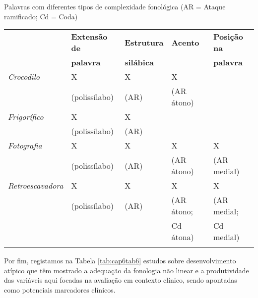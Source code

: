\documentclass[output=paper,colorlinks,citecolor=brown,booklanguage=portuguese]{langscibook}
\begin{document}
\begin{Tabela}
\caption{Palavras com diferentes tipos de complexidade fonológica (AR = Ataque ramificado; Cd = Coda)}
\label{tab:cap6tab5}


\begin{tabularx}{.95\textwidth}{lllll}
\lsptoprule
  & \textbf{Extensão de} & \textbf{Estrutura} & \textbf{Acento} & \textbf{Posição na}\\
  & \textbf{palavra} & \textbf{silábica} & &\textbf{palavra}\\
\midrule
  \emph{Crocodilo} & X & X & X & \uline{\phantom{xxxxxx}}\\
 & (polissílabo) & (AR) & (AR átono) &\\
 \tablevspace
 \emph{Frigorífico} & X & X & \uline{\phantom{xxxxxx}} & \uline{\phantom{xxxxxx}}\\
 & (polissílabo) &  (AR) &  &  \\
 \tablevspace
 \emph{Fotografia} & X & X & X & X\\
 & (polissílabo) &  (AR) & (AR átono) & (AR medial)\\
 \tablevspace
 \emph{Retroescavadora} & X & X & X & X\\
 & (polissílabo) &  (AR) & (AR átono;& (AR medial;\\
 &&& Cd átona) & Cd medial)\\
\lspbottomrule
 \end{tabularx}
 \end{Tabela}


 Por fim, registamos na Tabela \ref{tab:cap6tab6} estudos sobre desenvolvimento atípico que têm mostrado a adequação da fonologia não linear e a produtividade das variáveis aqui focadas na avaliação em contexto clínico, sendo apontadas como potenciais marcadores clínicos.
\end{document}
